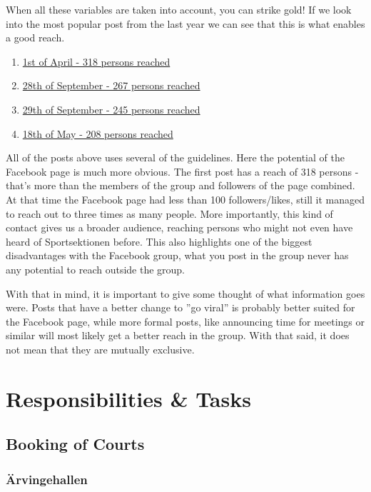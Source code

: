 \documentclass[12pt,a4paper]{article}
\begin{document}
			When all these variables are taken into account, you can strike gold! If we look into the most popular post from the last year we can see that this is what enables a good reach.
			\begin{enumerate}
				\item \href{https://www.facebook.com/sportsektionen/posts/797559543632932}{1st of April - 318 persons reached}
				\item \href{https://www.facebook.com/sportsektionen/photos/a.579827052072850.1073741829.577696502285905/878826875506198/?type=3}{28th of September - 267 persons reached}
				\item \href{https://www.facebook.com/sportsektionen/posts/879320665456819}{29th of September - 245 persons reached}
				\item \href{https://www.facebook.com/sportsektionen/posts/816932155029004}{18th of May - 208 persons reached}
			\end{enumerate}
			All of the posts above uses several of the guidelines. Here the potential of the Facebook page is much more obvious. The first post has a reach of 318 persons - that's more than the members of the group and followers of the page combined. At that time the Facebook page had less than 100 followers/likes, still it managed to reach out to three times as many people. More importantly, this kind of contact gives us a broader audience, reaching persons who might not even have heard of Sportsektionen before. This also highlights one of the biggest disadvantages with the Facebook group, what you post in the group never has any potential to reach outside the group.

			With that in mind, it is important to give some thought of what information goes were. Posts that have a better change to ''go viral'' is probably better suited for the Facebook page, while more formal posts, like announcing time for meetings or similar will most likely get a better reach in the group. With that said, it does not mean that they are mutually exclusive.

	\section{Responsibilities \& Tasks}
		\subsection{Booking of Courts}
			\subsubsection{Ärvingehallen}
\end{document}
